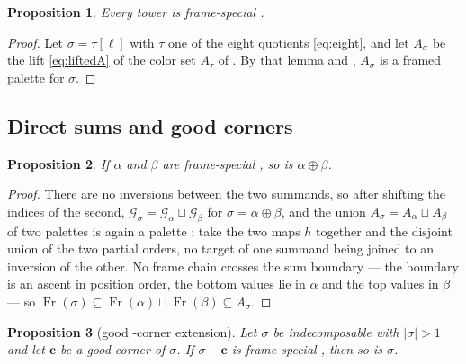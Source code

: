 \documentclass[12pt]{article}
\def\xspace{ }%
\newtheorem{proposition}[proposition]{Proposition}
\theoremstyle{definition}
\newcommand{\good}{good\xspace}
\newcommand{\spc}{special\xspace}
\newcommand{\pal}{palette\xspace}      %
\newcommand{\pals}{palettes\xspace}
\newcommand{\fpal}{framed \pal}        %
\newcommand{\pset}{A}                  %
\newcommand{\Gc}{\mathcal{G}}          %
\newcommand{\Fr}{\operatorname{Fr}}    %
\newcommand{\crn}{\mathbf{c}}              %
\begin{document}
\begin{proposition}\label{prop:C0}
Every tower is frame-\spc.
\end{proposition}

\begin{proof}
Let $\sigma = \tau[\ell]$ with $\tau$ one of the eight quotients
\eqref{eq:eight}, and let $\pset_\sigma$ be the lift \eqref{eq:liftedA} of the
color set $\pset_\tau$ of . By that lemma and
, $\pset_\sigma$ is a \fpal for $\sigma$.
\end{proof}

\subsection{Direct sums and \good corners}\label{ssec:forwardsteps}

\begin{proposition}\label{prop:directsum}
If $\alpha$ and $\beta$ are frame-\spc, so is $\alpha\oplus\beta$.
\end{proposition}

\begin{proof}
There are no inversions between the two summands, so after shifting the
indices of the second, $\Gc_\sigma = \Gc_\alpha \sqcup \Gc_\beta$ for
$\sigma = \alpha\oplus\beta$, and the union $\pset_\sigma = \pset_\alpha \sqcup
\pset_\beta$ of two \pals is again a \pal: take the two maps $h$ together and
the disjoint union of the two partial orders, no target of one summand
being joined to an inversion of the other. No
frame chain crosses the sum boundary --- the boundary is an ascent in
position order, the bottom values lie in $\alpha$ and the top values in
$\beta$ --- so $\Fr(\sigma) \subseteq \Fr(\alpha)\sqcup\Fr(\beta)
\subseteq \pset_\sigma$.
\end{proof}

\begin{proposition}[\good-corner extension]\label{prop:corner}
Let $\sigma$ be indecomposable with $|\sigma|>1$ and let $\crn$ be a \good corner of $\sigma$.
If $\sigma - \crn$ is frame-\spc, then so is $\sigma$.
\end{proposition}
\end{document}
